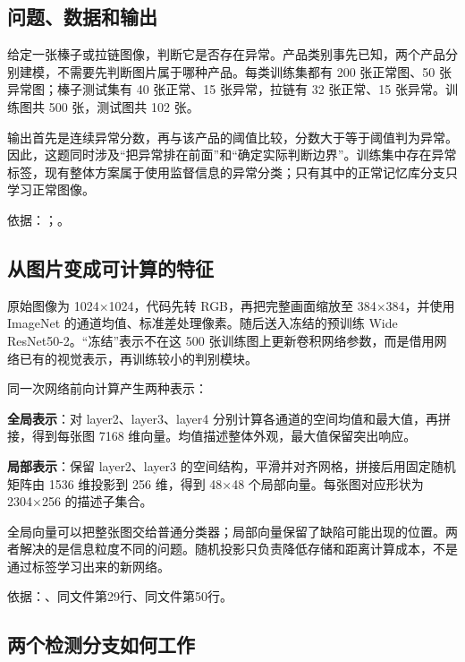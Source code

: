 \documentclass[UTF8,fontset=windows,11pt,a4paper]{ctexart}
\begin{document}
\subsection{问题、数据和输出}

给定一张榛子或拉链图像，判断它是否存在异常。产品类别事先已知，两个产品分别建模，不需要先判断图片属于哪种产品。每类训练集都有 200 张正常图、50 张异常图；榛子测试集有 40 张正常、15 张异常，拉链有 32 张正常、15 张异常。训练图共 500 张，测试图共 102 张。

输出首先是连续异常分数，再与该产品的阈值比较，分数大于等于阈值判为异常。因此，这题同时涉及“把异常排在前面”和“确定实际判断边界”。训练集中存在异常标签，现有整体方案属于使用监督信息的异常分类；只有其中的正常记忆库分支只学习正常图像。

依据：；。

\subsection{从图片变成可计算的特征}

原始图像为 1024×1024，代码先转 RGB，再把完整画面缩放至 384×384，并使用 ImageNet 的通道均值、标准差处理像素。随后送入冻结的预训练 Wide ResNet50-2。“冻结”表示不在这 500 张训练图上更新卷积网络参数，而是借用网络已有的视觉表示，再训练较小的判别模块。

同一次网络前向计算产生两种表示：

\par\noindent\textbullet\quad \textbf{全局表示}：对 layer2、layer3、layer4 分别计算各通道的空间均值和最大值，再拼接，得到每张图 7168 维向量。均值描述整体外观，最大值保留突出响应。\par
\par\noindent\textbullet\quad \textbf{局部表示}：保留 layer2、layer3 的空间结构，平滑并对齐网格，拼接后用固定随机矩阵由 1536 维投影到 256 维，得到 48×48 个局部向量。每张图对应形状为 2304×256 的描述子集合。\par

全局向量可以把整张图交给普通分类器；局部向量保留了缺陷可能出现的位置。两者解决的是信息粒度不同的问题。随机投影只负责降低存储和距离计算成本，不是通过标签学习出来的新网络。

依据：、同文件第29行、同文件第50行。

\subsection{两个检测分支如何工作}
\end{document}

